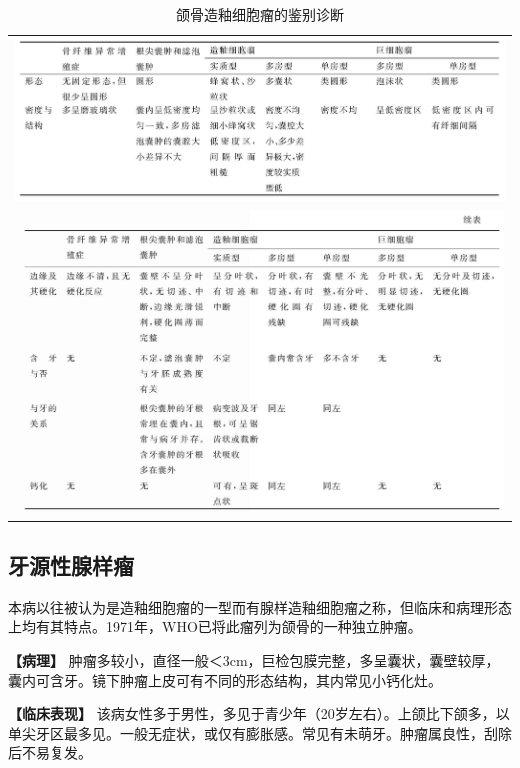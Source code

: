 \begin{longtable}{c}
  \caption{颌骨造釉细胞瘤的鉴别诊断}
  \label{tab7-2}\\
  \endfirsthead
  \caption[]{颌骨造釉细胞瘤的鉴别诊断}
  \endhead
\includegraphics[width=\textwidth,height=\textheight,keepaspectratio]{./images/Image00159.jpg}\\
\includegraphics[width=\textwidth,height=\textheight,keepaspectratio]{./images/Image00160.jpg}
\end{longtable}



\subsection{牙源性腺样瘤}

本病以往被认为是造釉细胞瘤的一型而有腺样造釉细胞瘤之称，但临床和病理形态上均有其特点。1971年，WHO已将此瘤列为颌骨的一种独立肿瘤。

\textbf{【病理】}
肿瘤多较小，直径一般＜3cm，巨检包膜完整，多呈囊状，囊壁较厚，囊内可含牙。镜下肿瘤上皮可有不同的形态结构，其内常见小钙化灶。

\textbf{【临床表现】}
该病女性多于男性，多见于青少年（20岁左右）。上颌比下颌多，以单尖牙区最多见。一般无症状，或仅有膨胀感。常见有未萌牙。肿瘤属良性，刮除后不易复发。

